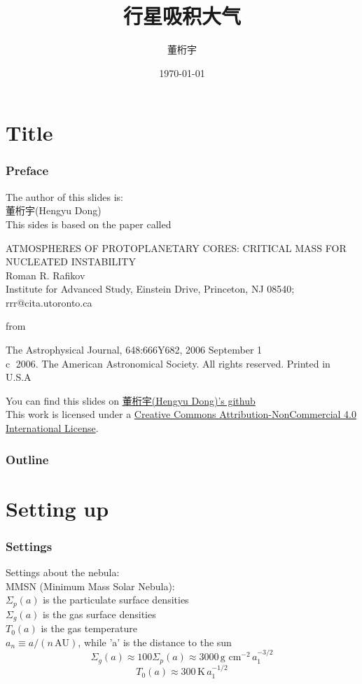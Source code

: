 \documentclass{beamer}
\title{行星吸积大气}
\author{董桁宇}
\date{\today}
\begin{document}
\section{Title}
\frame{\titlepage}
\begin{frame}
\frametitle{Preface}
The author of this slides is:\\
董桁宇(Hengyu Dong)\\
This sides is based on the paper called\\
\begin{center} 
ATMOSPHERES OF PROTOPLANETARY CORES: CRITICAL MASS FOR NUCLEATED INSTABILITY\\ 
Roman R. Rafikov\\
{\tiny Institute for Advanced Study, Einstein Drive, Princeton, NJ 08540; rrr@cita.utoronto.ca}
\end{center}
from\\
\begin{center}
The Astrophysical Journal, 648:666Y682, 2006 September 1\\
{\tiny \textcircled{c} 2006. The American Astronomical Society. All rights reserved. Printed in U.S.A}
\end{center}
You can find this slides on \href{https://github.com/little-potato-loria/the-pre-of-astrophysics}{董桁宇(Hengyu Dong)'s github}\\
{\tiny This work is licensed under a \href{https://creativecommons.org/licenses/by-nc/4.0/}{Creative Commons Attribution-NonCommercial 4.0 International License}.}
\end{frame}

\begin{frame}
\frametitle{Outline}
\tableofcontents
\end{frame}

\section{Setting up}
\begin{frame}
\frametitle{Settings}
Settings about the nebula:\\
MMSN (Minimum Mass Solar Nebula):\\
$\Sigma_p(a)$ is the particulate surface densities\\
$\Sigma_g(a)$ is the gas surface densities\\
$T_0(a)$ is the gas temperature \\
$a_n \equiv a/(n \, \text{AU})$, while 'a' is the distance to the sun
\begin{equation}
\Sigma_g(a) \approx 100 \Sigma_p(a) \approx 3000 \, \text{g cm}^{-2} \, a_1^{-3/2}
\end{equation}
\begin{equation}
T_0(a) \approx 300 \, \text{K} \, a_1^{-1/2}
\end{equation}
\end{frame}
\end{document}
